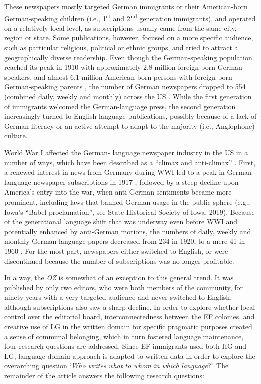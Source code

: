 \documentclass[output=paper]{langsci/langscibook}
\begin{document}
These newspapers mostly targeted German immigrants or their American-born German-speaking children (i.e., 1\textsuperscript{st} and 2\textsuperscript{nd} generation immigrants), and operated on a relatively local level, as subscriptions usually came from the same city, region or state. Some publications, however, focused on a more specific audience, such as particular religious, political or ethnic groups, and tried to attract a geographically diverse readership. Even though the German-speaking population reached its peak in 1910 with approximately 2.8 million foreign-born German-speakers, and almost 6.1 million American-born persons with foreign-born German-speaking parents \citep[213]{Kloss1966}, the number of German newspapers dropped to 554 (combined daily, weekly and monthly) across the US \citep[191]{Haller1988}. While the first generation of immigrants welcomed the German-language press, the second generation increasingly turned to English-language publications, possibly because of a lack of German literacy or an active attempt to adapt to the majority (i.e., Anglophone) culture.

World War I affected the German- language newspaper industry in the US in a number of ways, which have been described as a “climax and anti-climax” \citep[237]{Kloss1966}. First, a renewed interest in news from Germany during WWI led to a peak in German-language newspaper subscriptions in 1917 \citep[244]{Wittke1973}, followed by a steep decline upon America’s entry into the war, when anti-German sentiments became more prominent, including laws that banned German usage in the public sphere (e.g., Iowa’s “Babel proclamation”, see State Historical Society of Iowa, 2019). Because of the generational language shift that was underway even before WWI and potentially enhanced by anti-German motions, the numbers of daily, weekly and monthly German-language papers decreased from 234 in 1920, to a mere 41 in 1960 \citep[190]{Haller1988}. For the most part, newspapers either switched to English, or were discontinued because the number of subscriptions was no longer profitable.

In a way, the \textit{OZ} is somewhat of an exception to this general trend. It was published by only two editors, who were both members of the community, for ninety years with a very targeted audience and never switched to English, although subscriptions also saw a sharp decline. In order to explore whether local control over the editorial board, interconnectedness between the EF colonies, and creative use of LG in the written domain for specific pragmatic purposes created a sense of communal belonging, which in turn fostered language maintenance, four research questions are addressed. Since EF immigrants used both HG and LG,  language domain approach is adapted to written data in order to explore the overarching question ‘\textit{Who} \textit{writes} \textit{what} \textit{to} \textit{whom} \textit{in} \textit{which} \textit{language}?’. The remainder of the article answers the following research questions:
\end{document}
